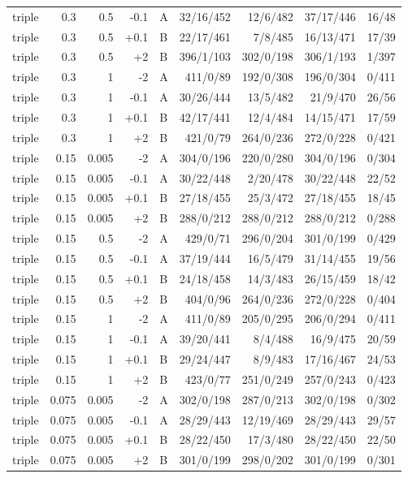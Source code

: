 \begin{longtable}{@{}lrrrlrrrr@{}}
triple & 0.3 & 0.5 & -0.1 & A & 32/16/452 & 12/6/482 & 37/17/446 & 16/48\\
triple & 0.3 & 0.5 & +0.1 & B & 22/17/461 & 7/8/485 & 16/13/471 & 17/39\\
triple & 0.3 & 0.5 & +2 & B & 396/1/103 & 302/0/198 & 306/1/193 & 1/397\\
triple & 0.3 & 1 & -2 & A & 411/0/89 & 192/0/308 & 196/0/304 & 0/411\\
triple & 0.3 & 1 & -0.1 & A & 30/26/444 & 13/5/482 & 21/9/470 & 26/56\\
triple & 0.3 & 1 & +0.1 & B & 42/17/441 & 12/4/484 & 14/15/471 & 17/59\\
triple & 0.3 & 1 & +2 & B & 421/0/79 & 264/0/236 & 272/0/228 & 0/421\\
triple & 0.15 & 0.005 & -2 & A & 304/0/196 & 220/0/280 & 304/0/196 & 0/304\\
triple & 0.15 & 0.005 & -0.1 & A & 30/22/448 & 2/20/478 & 30/22/448 & 22/52\\
triple & 0.15 & 0.005 & +0.1 & B & 27/18/455 & 25/3/472 & 27/18/455 & 18/45\\
triple & 0.15 & 0.005 & +2 & B & 288/0/212 & 288/0/212 & 288/0/212 & 0/288\\
triple & 0.15 & 0.5 & -2 & A & 429/0/71 & 296/0/204 & 301/0/199 & 0/429\\
triple & 0.15 & 0.5 & -0.1 & A & 37/19/444 & 16/5/479 & 31/14/455 & 19/56\\
triple & 0.15 & 0.5 & +0.1 & B & 24/18/458 & 14/3/483 & 26/15/459 & 18/42\\
triple & 0.15 & 0.5 & +2 & B & 404/0/96 & 264/0/236 & 272/0/228 & 0/404\\
triple & 0.15 & 1 & -2 & A & 411/0/89 & 205/0/295 & 206/0/294 & 0/411\\
triple & 0.15 & 1 & -0.1 & A & 39/20/441 & 8/4/488 & 16/9/475 & 20/59\\
triple & 0.15 & 1 & +0.1 & B & 29/24/447 & 8/9/483 & 17/16/467 & 24/53\\
triple & 0.15 & 1 & +2 & B & 423/0/77 & 251/0/249 & 257/0/243 & 0/423\\
triple & 0.075 & 0.005 & -2 & A & 302/0/198 & 287/0/213 & 302/0/198 & 0/302\\
triple & 0.075 & 0.005 & -0.1 & A & 28/29/443 & 12/19/469 & 28/29/443 & 29/57\\
triple & 0.075 & 0.005 & +0.1 & B & 28/22/450 & 17/3/480 & 28/22/450 & 22/50\\
triple & 0.075 & 0.005 & +2 & B & 301/0/199 & 298/0/202 & 301/0/199 & 0/301\\

\end{longtable}

